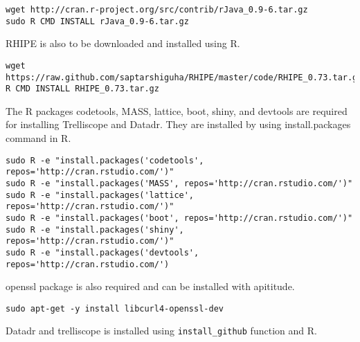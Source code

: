 \documentclass[11pt]{article}
\begin{document}
\begin{verbatim}
wget http://cran.r-project.org/src/contrib/rJava_0.9-6.tar.gz
sudo R CMD INSTALL rJava_0.9-6.tar.gz
\end{verbatim}


RHIPE is also to be downloaded and installed using R.

\begin{verbatim}
wget https://raw.github.com/saptarshiguha/RHIPE/master/code/RHIPE_0.73.tar.gz
R CMD INSTALL RHIPE_0.73.tar.gz
\end{verbatim}


The R packages codetools, MASS, lattice, boot, shiny, and devtools are
required for installing Trelliscope and Datadr. They are installed by
using install.packages command in R.

\begin{verbatim}
sudo R -e "install.packages('codetools', repos='http://cran.rstudio.com/')"
sudo R -e "install.packages('MASS', repos='http://cran.rstudio.com/')"
sudo R -e "install.packages('lattice', repos='http://cran.rstudio.com/')"
sudo R -e "install.packages('boot', repos='http://cran.rstudio.com/')"
sudo R -e "install.packages('shiny', repos='http://cran.rstudio.com/')"
sudo R -e "install.packages('devtools', repos='http://cran.rstudio.com/')
\end{verbatim}

openssl package is also required and can be installed with apititude.

\begin{verbatim}
sudo apt-get -y install libcurl4-openssl-dev
\end{verbatim}


Datadr and trelliscope is installed using \texttt{install\_github}
function and R.
\end{document}
